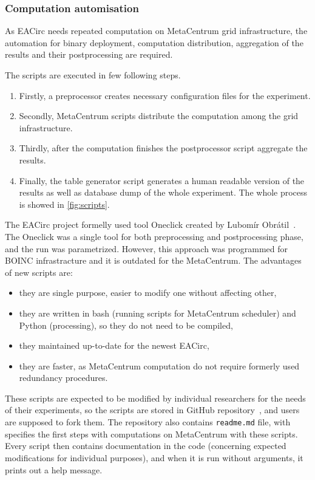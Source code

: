 \documentclass[
  print, %
  Table,   %
  nolof,     %
  nolot,     %
  11pt, %
  oneside  %
]{fithesis3}
\begin{document}
\subsubsection{\textbf{Computation automisation}}
\label{subsubsec:method-spec-ss-auto}

As EACirc needs repeated computation on MetaCentrum grid infrastructure, the automation for binary deployment, computation distribution, aggregation of the results and their postprocessing are required.

The scripts are executed in few following steps.

\begin{enumerate}[noitemsep,topsep=3pt,parsep=3pt,partopsep=3pt]
 \item Firstly, a preprocessor creates necessary configuration files for the experiment.
 \item Secondly, MetaCentrum scripts distribute the computation among the grid infrastructure.
 \item Thirdly, after the computation finishes the postprocessor script aggregate the results. 
 \item Finally, the table generator script generates a human readable version of the results as well as database dump of the whole experiment. The whole process is showed in \cref{fig:scripts}.
\end{enumerate}

The EACirc project formelly used tool Oneclick created by Lubomír Obrátil~\cite{obratilBcThesis}. The Oneclick was a single tool for both preprocessing and postprocessing phase, and the run was parametrized. However, this approach was programmed for BOINC infrastracture and it is outdated for the MetaCentrum. The advantages of new scripts are: 

\begin{itemize}
    \item they are single purpose, easier to modify one without affecting other,
    \item they are written in bash (running scripts for MetaCentrum scheduler) and Python (processing), so they do not need to be compiled,
    \item they maintained up-to-date for the newest EACirc,
    \item they are faster, as MetaCentrum computation do not require formerly used redundancy procedures.
\end{itemize}

These scripts are expected to be modified by individual researchers for the needs of their experiments, so the scripts are stored in GitHub repository~\cite{eaUtils}, and users are supposed to fork them. The repository also contains \texttt{readme.md} file, with specifies the first steps with computations on MetaCentrum with these scripts. Every script then contains documentation in the code (concerning expected modifications for individual purposes), and when it is run without arguments, it prints out a help message.
\end{document}
